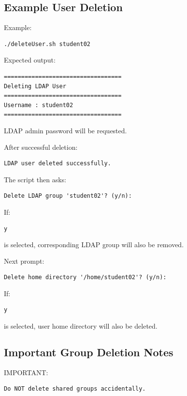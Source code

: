 \documentclass[11pt]{article}
\begin{document}
\subsection{Example User Deletion}
\label{sec:orge286187}

Example:

\begin{verbatim}
./deleteUser.sh student02
\end{verbatim}

Expected output:

\begin{verbatim}
==================================
Deleting LDAP User
==================================
Username : student02
==================================
\end{verbatim}

LDAP admin password will be requested.

After successful deletion:

\begin{verbatim}
LDAP user deleted successfully.
\end{verbatim}

The script then asks:

\begin{verbatim}
Delete LDAP group 'student02'? (y/n):
\end{verbatim}

If:

\begin{verbatim}
y
\end{verbatim}

is selected, corresponding LDAP group will also be removed.

Next prompt:

\begin{verbatim}
Delete home directory '/home/student02'? (y/n):
\end{verbatim}

If:

\begin{verbatim}
y
\end{verbatim}

is selected, user home directory will also be deleted.
\subsection{Important Group Deletion Notes}
\label{sec:org660ee3c}

IMPORTANT:

\begin{verbatim}
Do NOT delete shared groups accidentally.
\end{verbatim}
\end{document}
